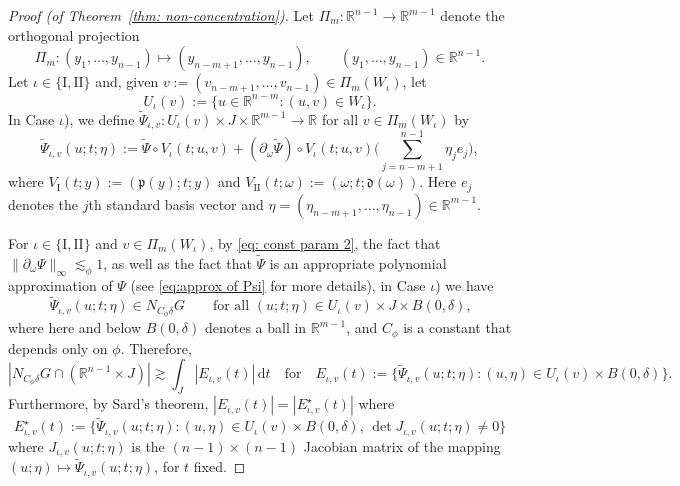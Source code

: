 \documentclass[reqno]{amsart}
\numberwithin{equation}{section}
\newcommand{\R}{\mathbb{R}}
\newcommand{\ud}{\mathrm{d}}
\newcommand{\fd}{\mathfrak{d}}
\newcommand{\fp}{\mathfrak{p}}
\theoremstyle{plain}
\theoremstyle{definition}
\newcommand{\tI}{\mathrm{I}}
\newcommand{\tII}{\mathrm{II}}
\begin{document}
\begin{proof}[Proof (of Theorem~\ref{thm: non-concentration})]
Let $\Pi_m \colon \R^{n-1} \to \R^{m-1}$ denote the orthogonal projection 
\begin{equation*}
  \Pi_m \colon (y_1, \dots, y_{n-1}) \mapsto (y_{n-m +1}, \dots, y_{n-1}), \qquad   (y_1, \dots, y_{n-1}) \in \R^{n-1}. 
\end{equation*}
Let $\iota \in \{\tI, \tII\}$ and, given $v := (v_{n-m+1}, \dots, v_{n-1}) \in \Pi_m(W_{\iota})$, let 
\begin{equation*}
  U_{\iota}(v) :=  \big\{u \in \R^{n-m} :  (u, v) \in W_{\iota} \big\}.
\end{equation*}
In Case $\iota$), we define $\widetilde{\Psi}_{\iota, v} \colon U_{\iota}(v) \times J \times \R^{m-1} \to \R$ for all $v \in \Pi_m(W_{\iota})$ by
\begin{equation*}
   \widetilde{\Psi}_{\iota, v} (u;t;\eta) := \widetilde{\Psi} \circ V_{\iota}(t; u, v) + (\partial_\omega\widetilde{\Psi}) \circ V_{\iota}(t;u,v)\big(\sum_{j=n-m+1}^{n-1}\eta_je_j\big),
\end{equation*}
where $V_{\tI}(t;y):=(\fp(y);t;y)$ and $V_{\tII}(t;\omega):=(\omega;t;\fd(\omega))$. Here $e_j$ denotes the $j$th standard basis vector and $\eta = (\eta_{n-m+1}, \dots, \eta_{n-1}) \in \R^{m-1}$. 

For $\iota \in \{\tI, \tII\}$ and $v \in \Pi_m(W_{\iota})$, by \eqref{eq: const param 2}, the fact that $\|\partial_{\omega}\Psi\|_\infty\lesssim_\phi 1$, as well as the fact that $\widetilde{\Psi}$ is an appropriate polynomial approximation of $\Psi$ (see \eqref{eq:approx of Psi} for more details), in Case $\iota$) we have
\begin{equation*}
    \widetilde{\Psi}_{\iota, v}(u;t;\eta) \in N_{C_\phi\delta}G\qquad\textrm{for all $(u;t;\eta) \in U_{\iota}(v) \times J \times B(0,\delta)$,}
\end{equation*}
where here and below $B(0,\delta)$ denotes a ball in $\R^{m-1}$, and $C_\phi$ is a constant that depends only on $\phi$. Therefore,
\begin{equation}\label{eq: freeze 4}
    |N_{C_\phi\delta}G\cap (\R^{n-1}\times J)|\gtrsim \int_J|E_{\iota, v}(t)|\,\ud t \quad \textrm{for} \quad E_{\iota, v}(t) := \big\{ \widetilde{\Psi}_{\iota, v}(u;t;\eta): (u, \eta) \in U_{\iota}(v) \times B(0,\delta)\big\}.
\end{equation}
Furthermore, by Sard's theorem, $|E_{\iota, v}(t)| = |E_{\iota, v}^{\star}(t)|$ where
\begin{equation*}
     E_{\iota, v}^{\star}(t) := \big\{\widetilde{\Psi}_{\iota, v}(u;t;\eta): (u, \eta) \in U_{\iota}(v) \times B(0,\delta),\, \det J_{\iota, v}(u; t; \eta) \neq 0 \big\}
\end{equation*}
where $J_{\iota, v}(u; t; \eta)$ is the $(n-1) \times (n-1)$ Jacobian matrix of the mapping $(u; \eta) \mapsto \widetilde{\Psi}_{\iota, v}(u;t;\eta)$, for $t$ fixed.


\end{proof}
\end{document}
